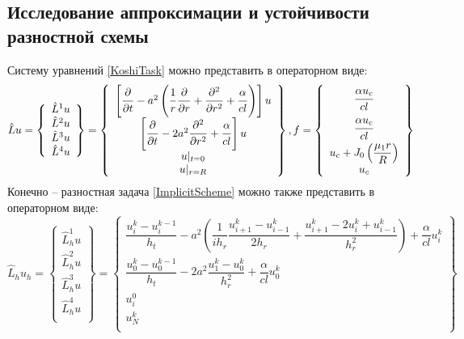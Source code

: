 \documentclass[a4paper,12pt,russian, fleqn]{extreport}
\begin{document}
	\subsection{Исследование аппроксимации и устойчивости разностной схемы}
	Систему уравнений \eqref{KoshiTask} можно представить в операторном виде:
	\begin{equation}\label{OperatorViewKoshiTask}
 	\hat{L}u = \left\{\begin{array}{l}
 		\hat{L}^1u \\
 		\hat{L}^2u \\
 		\hat{L}^3u \\
 		\hat{L}^4u \\
 	\end{array}
 	\right\} = \left\{\begin{array}{c}
 		\left[\dfrac{\strut\partial}{\strut\partial t} - a^2\left( \dfrac{\strut 1}{\strut r}\dfrac{\strut \partial }{\strut \partial r} + \dfrac{\strut \partial^2}{\strut \partial r^2} + \dfrac{\strut \alpha}{\strut cl} \right)\right]u \\
 		\left[\dfrac{\strut \partial }{\strut \partial t} - 2a^2\dfrac{\strut\partial^2}{\strut\partial r^2} + \dfrac{\strut\alpha}{\strut cl}\right]u\\
 		u\vert_{t=0} \\
 		u\vert_{r=R} \\
 	\end{array}\right\}, f = \left\{\begin{array}{c}
 		\dfrac{\strut \alpha u_c}{\strut cl} \\
 		\dfrac{\strut \alpha u_c}{\strut cl} \\
 		u_c + J_0\left(\dfrac{\mu_1 r}{R}\right) \\
 		u_c
 	\end{array}\right\}
	\end{equation}
 	Конечно -- разностная задача \eqref{ImplicitScheme} можно также представить в операторном виде:
 	\begin{equation}\label{OperatorViewImplicitScheme}
 	\hat{L}_hu_h = \left\{\begin{array}{l}
 	\hat{L}_h^1u \\
 	\hat{L}_h^2u \\
 	\hat{L}_h^3u \\
 	\hat{L}_h^4u \\
 	\end{array}
 	\right\} = \left\{\begin{array}{c}
 	\dfrac{u_i^{k}-u_i^{k-1}}{h_t} - a^2\left(\dfrac{1}{ih_r}\dfrac{u_{i+1}^k - u_{i-1}^k}{2h_r} +\dfrac{u_{i+1}^k - 2u_i^k + u_{i-1}^k}{h^2_r}\right) + \dfrac{\alpha}{cl}u_i^k \\
 	\dfrac{u_0^{k}-u_0^{k-1}}{h_t} - 2a^2\dfrac{u_1^k-u_0^k}{h_r^2} + \dfrac{\alpha}{cl}u_0^k\\
 	u_i^0 \\
 	u_N^k \\
 	\end{array}\right\}
 	\end{equation}
\end{document}
